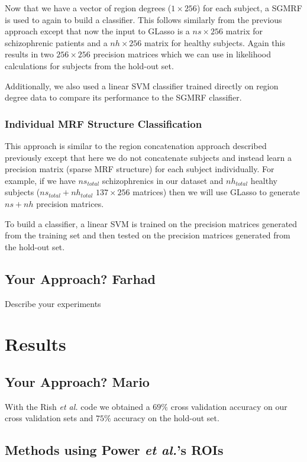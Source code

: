 \documentclass{article} %
\begin{document}
Now that we have a vector of region degrees ($1 \times 256$) for each subject,
a SGMRF is used to again to build a classifier. This follows similarly from
the previous approach except that now the input to GLasso is a $ns \times 256$
matrix for schizophrenic patients and a $nh \times256$ matrix for healthy
subjects. Again this results in two $256 \times 256$ precision matrices which
we can use in likelihood calculations for subjects from the hold-out set.

Additionally, we also used a linear SVM classifier trained directly on
region degree data to compare its performance to the SGMRF classifier.

\subsubsection{Individual MRF Structure Classification}
This approach is similar to the region concatenation approach described 
previously except that here we do not concatenate subjects and instead
learn a precision matrix (sparse MRF structure) for each subject 
individually. For example, if we have $ns_{total}$ schizophrenics in our 
dataset and $nh_{total}$ healthy subjects ($ns_{total} + nh_{total}$ 
$137 \times 256$ matrices) then we will use GLasso to generate $ns + nh$ 
precision matrices.

To build a classifier, a linear SVM is trained on the precision matrices 
generated from the training set and then tested on the precision matrices 
generated from the hold-out set.

\subsection{Your Approach? Farhad}
Describe your experiments

\section{Results}

\subsection{Your Approach? Mario}
With the Rish \emph{et al.} code we obtained a $69\%$ cross validation 
accuracy on our cross validation sets and $75\%$ accuracy on the hold-out 
set.

\subsection{Methods using Power \emph{et al.}'s ROIs}
\end{document}
